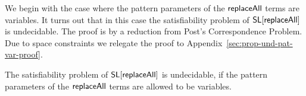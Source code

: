 %
%
%
%

We begin with the case where the pattern parameters of the $\mathsf{replaceAll}$ terms are variables. It turns out that in this case the satisfiability problem of $\mathsf{SL}[\mathsf{replaceAll}]$ is undecidable.
The proof is by a reduction from Post's Correspondence Problem. Due to space constraints we relegate the proof to Appendix~\ref{sec:prop-und-pat-var-proof}.
%

\begin{proposition}\label{prop-und-pat-var}
The satisfiability problem of $\mathsf{SL}[\mathsf{replaceAll}]$ is undecidable, if the pattern parameters of the $\mathsf{replaceAll}$ terms are allowed to be variables.
\end{proposition}


